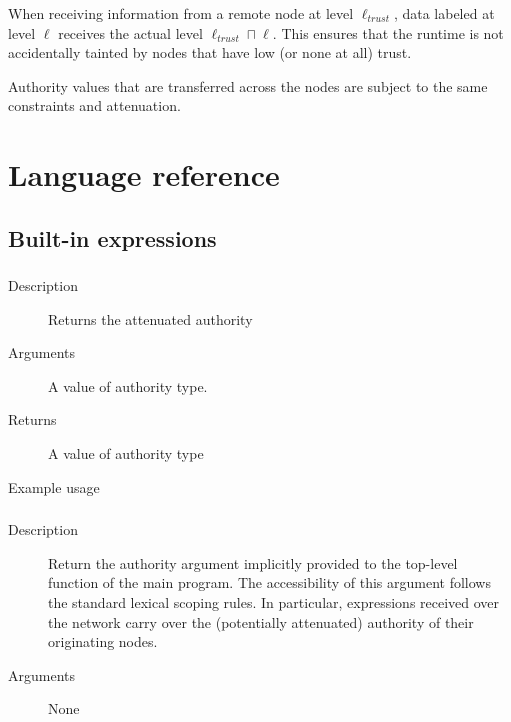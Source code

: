When receiving information from a remote node at level $\ell_{\mathit{trust}}$, 
data labeled at level $\ell$ receives the actual level $\ell_{\mathit{trust}} \sqcap \ell$. 
This ensures that the runtime is not accidentally tainted by nodes that have low (or none at all) trust.

Authority values that are transferred across the nodes are subject to the same constraints and attenuation.



\clearpage
\appendix
\section{Language reference}

\subsection{Built-in expressions}

\subsubsection{}
\begin{description}
    \item [Description] Returns the attenuated authority 
    \item [Arguments] A value of authority type.
    \item [Returns] A value of authority type
    \item [Example usage] 
\end{description}


\subsubsection{}

\begin{description}
    \item [Description] Return the authority argument implicitly provided to the top-level function of the main program.
The accessibility of this argument follows the standard lexical scoping rules. In particular, expressions received over the network carry over the (potentially attenuated) authority of their originating nodes.
    \item [Arguments] None
\end{description}

